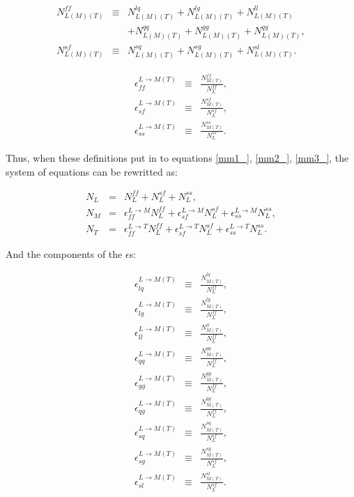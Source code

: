 \documentclass[12pt,oneandhalf,chaparabic,phys,ms,eng]{metu}
\begin{document}
\begin{eqnarray}
N_{L(M)(T)}^{ff} & \equiv & N_{L(M)(T)}^{lq} + N_{L(M)(T)}^{lg} + N_{L(M)(T)}^{ll} \nonumber \\
& & + N_{L(M)(T)}^{qq} + N_{L(M)(T)}^{gg} + N_{L(M)(T)}^{qg}, \label{eq:N1_}\\
N_{L(M)(T)}^{sf} & \equiv & N_{L(M)(T)}^{sq} + N_{L(M)(T)}^{sg} + N_{L(M)(T)}^{sl}. \label{eq:N2_}
\end{eqnarray}

\begin{eqnarray}
\epsilon_{ff}^{L \rightarrow M(T)} & \equiv & \frac{N_{M(T)}^{ff}}{N_{L}^{ff}}, \label{eq:eps1_}\\
\epsilon_{sf}^{L \rightarrow M(T)} & \equiv & \frac{N_{M(T)}^{sf}}{N_{L}^{sf}}, \label{eq:eps2_}\\
\epsilon_{ss}^{L \rightarrow M(T)} & \equiv & \frac{N_{M(T)}^{ss}}{N_{L}^{ss}}. \label{eq:eps3_}
\end{eqnarray}

Thus, when these definitions put in to equations \ref{mm1_}, \ref{mm2_}, \ref{mm3_}, the system of equations can be rewritted as:

\begin{eqnarray}
N_{L} & = & N_{L}^{ff} + N_{L}^{sf} + N_{L}^{ss}, \label{eq:mm4_}\\
N_{M} & = & \epsilon_{ff}^{L \rightarrow M} N_{L}^{ff} + \epsilon_{sf}^{L \rightarrow M} N_{L}^{sf} + \epsilon_{ss}^{L \rightarrow M} N_{L}^{ss}, \label{eq:mm5_}\\
N_{T} & = & \epsilon_{ff}^{L \rightarrow T} N_{L}^{ff} + \epsilon_{sf}^{L \rightarrow T} N_{L}^{sf} + \epsilon_{ss}^{L \rightarrow T} N_{L}^{ss}. \label{eq:mm6_}
\end{eqnarray}


And the components of the $\epsilon$s:

\begin{eqnarray}
\epsilon_{lq}^{L \rightarrow M(T)} & \equiv & \frac{N_{M(T)}^{lq}}{N_{L}^{ff}}, \label{eq:eps4_}\\
\epsilon_{lg}^{L \rightarrow M(T)} & \equiv & \frac{N_{M(T)}^{lg}}{N_{L}^{ff}}, \label{eq:eps4__}\\
\epsilon_{ll}^{L \rightarrow M(T)} & \equiv & \frac{N_{M(T)}^{ll}}{N_{L}^{ff}}, \label{eq:eps5_}\\
\epsilon_{qq}^{L \rightarrow M(T)} & \equiv & \frac{N_{M(T)}^{qq}}{N_{L}^{ff}}, \label{eq:eps6__}\\
\epsilon_{gg}^{L \rightarrow M(T)} & \equiv & \frac{N_{M(T)}^{gg}}{N_{L}^{ff}}, \label{eq:eps6___}\\
\epsilon_{qg}^{L \rightarrow M(T)} & \equiv & \frac{N_{M(T)}^{qg}}{N_{L}^{ff}}, \label{eq:eps6____}\\
\epsilon_{sq}^{L \rightarrow M(T)} & \equiv & \frac{N_{M(T)}^{sq}}{N_{L}^{sf}}, \label{eq:eps7}\\
\epsilon_{sg}^{L \rightarrow M(T)} & \equiv & \frac{N_{M(T)}^{sg}}{N_{L}^{sf}}, \label{eq:eps8}\\
\epsilon_{sl}^{L \rightarrow M(T)} & \equiv & \frac{N_{M(T)}^{sl}}{N_{L}^{sf}}. \label{eq:eps8_}
\end{eqnarray}
\end{document}
